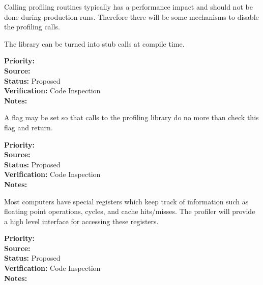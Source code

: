 
Calling profiling routines typically has a performance impact and should not
be done during production runs.  Therefore there will be some mechanisms to 
disable the profiling calls.


The library can be turned into stub calls at compile time.

\begin{reqlist}
{\bf Priority:}  \\
{\bf Source:}  \\
{\bf Status:} Proposed \\
{\bf Verification:} Code Inspection \\
{\bf Notes:} 
\end{reqlist}


A flag may be set so that calls to the profiling library do no more than check
this flag and return.

\begin{reqlist}
{\bf Priority:}  \\
{\bf Source:}  \\
{\bf Status:} Proposed \\
{\bf Verification:} Code Inspection \\
{\bf Notes:} 
\end{reqlist}


Most computers have special registers which keep track of information such
as floating point operations, cycles, and cache hits/misses.  The profiler will
provide a high level interface for accessing these registers.

\begin{reqlist}
{\bf Priority:}  \\
{\bf Source:}  \\
{\bf Status:} Proposed \\
{\bf Verification:} Code Inspection \\
{\bf Notes:} 
\end{reqlist}
